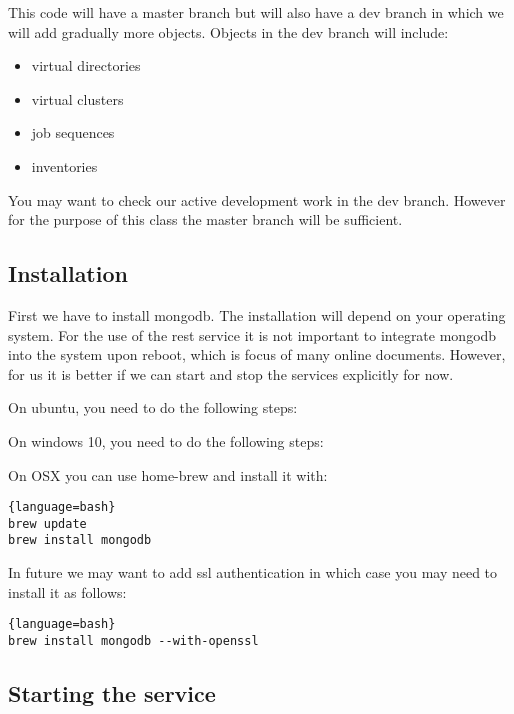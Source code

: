 This code will have a master branch but will also have a dev branch in
which we will add gradually more objects. Objects in the dev branch will
include:

\begin{itemize}
\item
 virtual directories
\item
 virtual clusters
\item
 job sequences
\item
 inventories
\end{itemize}

You may want to check our active development work in the dev branch.
However for the purpose of this class the master branch will be
sufficient.

\subsection{Installation}\label{installation}

First we have to install mongodb. The installation will depend on your
operating system. For the use of the rest service it is not important to
integrate mongodb into the system upon reboot, which is focus of many
online documents. However, for us it is better if we can start and stop
the services explicitly for now.

On ubuntu, you need to do the following steps:


On windows 10, you need to do the following steps:


On OSX you can use home-brew and install it with:

\begin{lstlisting}{language=bash}
brew update
brew install mongodb
\end{lstlisting}

In future we may want to add ssl authentication in which case you
may
need to install it as follows:

\begin{lstlisting}{language=bash}
brew install mongodb --with-openssl
\end{lstlisting}

\subsection{Starting the service}\label{starting-the-service}

